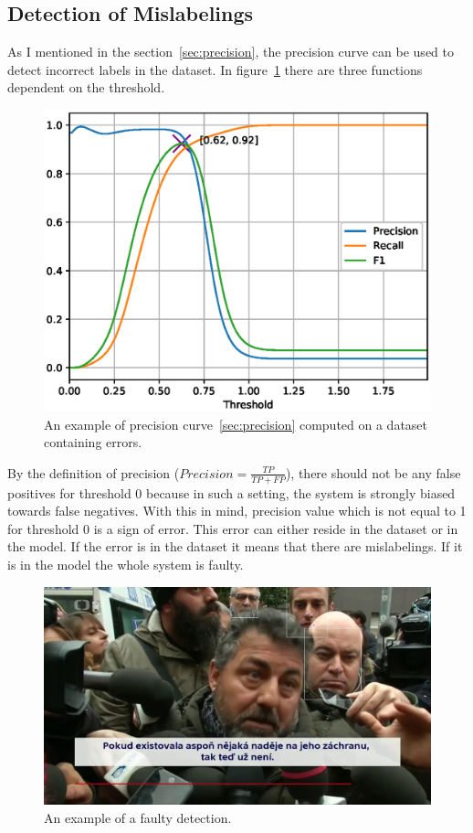 \subsection{Detection of Mislabelings}\label{subsec:detection-mislabelings}
As I mentioned in the section~\ref{sec:precision}, the precision curve can be used to detect incorrect labels in the
dataset.
In figure~\ref{fig:faulty_prft} there are three functions dependent on the threshold.

\begin{figure}[H]
    \centering
    \includegraphics[width=0.95\columnwidth]{images/implementation/faulty_prft.eps}
    \caption{An example of precision curve~\ref{sec:precision} computed on a dataset containing errors.}
    \label{fig:faulty_prft}
\end{figure}

By the definition of precision ($Precision = \frac{TP}{TP+FP}$), there should not be any false positives
for threshold 0 because in such a setting, the system is strongly biased towards false negatives.
With this in mind, precision value which is not equal to 1 for threshold 0 is a sign of error.
This error can either reside in the dataset or in the model.
If the error is in the dataset it means that there are mislabelings.
If it is in the model the whole system is faulty.

\begin{figure}[H]
    \centering
    \includegraphics[width=0.9\columnwidth]{images/implementation/faulty_detection.jpg}
    \caption{An example of a faulty detection.}
    \label{fig:faulty_bbox}
\end{figure}

